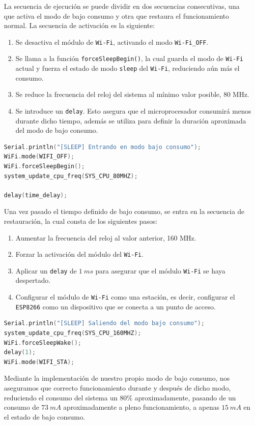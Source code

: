 La secuencia de ejecución se puede dividir en dos secuencias consecutivas, una que activa el modo de bajo consumo y otra que restaura el funcionamiento normal. La secuencia de activación es la siguiente:

\begin{enumerate}
    \item Se desactiva el módulo de \texttt{Wi-Fi}, activando el modo \texttt{Wi-Fi\_OFF}.
    \item Se llama a la función \texttt{forceSleepBegin()}, la cual guarda el modo de \texttt{Wi-Fi} actual y fuerza el estado de modo \texttt{sleep} del \texttt{Wi-Fi}, reduciendo aún más el consumo.
    \item Se reduce la frecuencia del reloj del sistema al mínimo valor posible, $80$ MHz.
    \item Se introduce un \texttt{delay}. Esto asegura que el microprocesador consumirá menos durante dicho tiempo, además se utiliza para definir la duración aproximada del modo de bajo consumo.
\end{enumerate}

\begin{lstlisting}[captionpos=b, caption={Activación modo bajo consumo}, language=c++]
Serial.println("[SLEEP] Entrando en modo bajo consumo");
WiFi.mode(WIFI_OFF);
WiFi.forceSleepBegin();
system_update_cpu_freq(SYS_CPU_80MHZ);

delay(time_delay);
\end{lstlisting}

Una vez pasado el tiempo definido de bajo consumo, se entra en la secuencia de restauración, la cual consta de los siguientes pasos:

\begin{enumerate}
    \item Aumentar la frecuencia del reloj al valor anterior, 160 MHz.
    \item Forzar la activación del módulo del \texttt{Wi-Fi}.
    \item Aplicar un \texttt{delay} de $1\ ms$ para asegurar que el módulo \texttt{Wi-Fi} se haya despertado.
    \item Configurar el módulo de \texttt{Wi-Fi} como una estación, es decir, configurar el \texttt{ESP8266} como un dispositivo que se conecta a un punto de acceso.
\end{enumerate}

\begin{lstlisting}[captionpos=b, caption={Restauración modo bajo consumo}, language=c++]
Serial.println("[SLEEP] Saliendo del modo bajo consumo");
system_update_cpu_freq(SYS_CPU_160MHZ);
WiFi.forceSleepWake();
delay(1);
WiFi.mode(WIFI_STA);
\end{lstlisting}

Mediante la implementación de nuestro propio modo de bajo consumo, nos aseguramos que correcto funcionamiento durante y después de dicho modo, reduciendo el consumo del sistema un $80\%$ aproximadamente, pasando de un consumo de $73\  mA$ aproximadamente a pleno funcionamiento, a apenas $15\ mA$ en el estado de bajo consumo.
